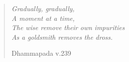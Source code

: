 \cleartorecto
\thispagestyle{empty}

\mbox{}\vfill

\begin{verse}

{\itshape
Gradually, gradually,\\
A moment at a time,\\
The wise remove their own impurities\\
As a goldsmith removes the dross.

Dhammapada v.239
}

\end{verse}

\vfill\mbox{}
